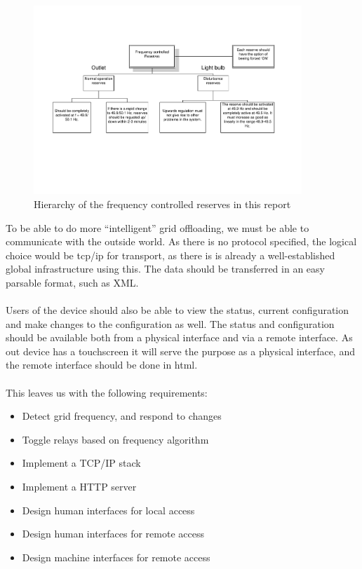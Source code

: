 \begin{figure}[!h]
  \centering
  \label{fig:reserver_demands}
  \includegraphics[width=0.9\textwidth]{figs/Demands_for_automatic_active_reserves.pdf}
  \caption{Hierarchy of the frequency controlled reserves in this report}
\end{figure}
To be able to do more ``intelligent'' grid offloading, we must be able to communicate with the outside world. As there is no protocol specified, the logical choice would be tcp/ip for transport, as there is is already a well-established global infrastructure using this. The data should be transferred in an easy parsable format, such as XML.\\\\
Users of the device should also be able to view the status, current configuration and make changes to the configuration as well. The status and configuration should be available both from a physical interface and via a remote interface. As out device has a touchscreen it will serve the purpose as a physical interface, and the remote interface should be done in html.\\\\
This leaves us with the following requirements:
\begin{itemize}
\item Detect grid frequency, and respond to changes
\item Toggle relays based on frequency algorithm
\item Implement a TCP/IP stack
\item Implement a HTTP server
\item Design human interfaces for local access
\item Design human interfaces for remote access
\item Design machine interfaces for remote access
\end{itemize}

